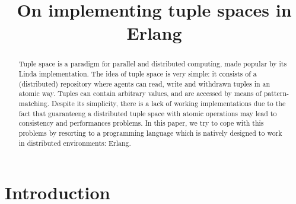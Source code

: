 \documentclass[submission,copyright,creativecommons]{eptcs}
\title{On implementing tuple spaces in Erlang}
\begin{document}
\maketitle

\begin{abstract}
Tuple space is a paradigm for parallel and distributed computing, made popular by its Linda implementation.
The idea of tuple space is very simple: it consists of a (distributed) repository where agents can read, write and withdrawn tuples in an atomic way. Tuples can contain arbitrary values, and are accessed by means of pattern-matching. Despite its simplicity, there is a lack of working implementations due to the fact that guaranteeng a distributed tuple space with atomic operations may lead to consistency and performances problems.  In this paper, we try to cope with this  problems by resorting to a programming language which is natively designed to work in distributed environments: Erlang. 
\end{abstract}

\section{Introduction}


\nocite{*}


\end{document}
